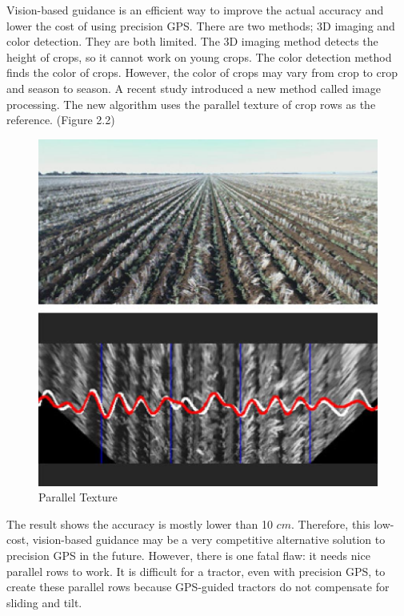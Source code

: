 \documentclass[letterpaper,12pt,oneside]{book}
\begin{document}
		Vision-based guidance is an efficient way to improve the actual accuracy and lower the cost of using precision GPS. There are two methods; 3D imaging and color detection. They are both limited. The 3D imaging method detects the height of crops, so it cannot work on young crops. The color detection method finds the color of crops. However, the color of crops may vary from crop to crop and season to season. A recent study introduced a new method called image processing. The new algorithm uses the parallel texture of crop rows as the reference. \cite{english2014vision} (Figure 2.2)
		
		\begin{figure}[ht!]
			\begin{center}
				\includegraphics[scale = 0.5]{parallel.jpg}
				\caption{Parallel Texture}
			\end{center}
		\end{figure}
		
		The result shows the accuracy is mostly lower than 10 $cm$. Therefore, this low-cost, vision-based guidance may be a very competitive alternative solution to precision GPS in the future. However, there is one fatal flaw: it needs nice parallel rows to work. It is difficult for a tractor, even with precision GPS, to create these parallel rows because  GPS-guided tractors do not compensate for sliding and tilt.
		
\end{document}
